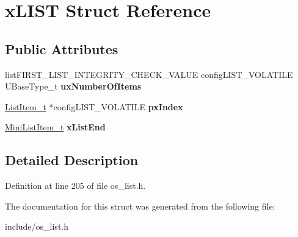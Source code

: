 \hypertarget{structxLIST}{}\section{x\+L\+I\+ST Struct Reference}
\label{structxLIST}
\subsection*{Public Attributes}
\begin{DoxyCompactItemize}
\item 
\mbox{\label{structxLIST_aa5cb7cdc699e1252af0441e46e427a03}} 
list\+F\+I\+R\+S\+T\+\_\+\+L\+I\+S\+T\+\_\+\+I\+N\+T\+E\+G\+R\+I\+T\+Y\+\_\+\+C\+H\+E\+C\+K\+\_\+\+V\+A\+L\+UE config\+L\+I\+S\+T\+\_\+\+V\+O\+L\+A\+T\+I\+LE U\+Base\+Type\+\_\+t {\bfseries ux\+Number\+Of\+Items}
\item 
\mbox{\label{structxLIST_a7bf64d87701493b4c8c5c977682500d7}} 
\mbox{\hyperlink{structxLIST__ITEM}{List\+Item\+\_\+t}} $\ast$config\+L\+I\+S\+T\+\_\+\+V\+O\+L\+A\+T\+I\+LE {\bfseries px\+Index}
\item 
\mbox{\label{structxLIST_a49ad62fa153126e27e273811167b336a}} 
\mbox{\hyperlink{structxMINI__LIST__ITEM}{Mini\+List\+Item\+\_\+t}} {\bfseries x\+List\+End}
\end{DoxyCompactItemize}


\subsection{Detailed Description}


Definition at line 205 of file os\+\_\+list.\+h.



The documentation for this struct was generated from the following file\+:\begin{DoxyCompactItemize}
\item 
include/os\+\_\+list.\+h\end{DoxyCompactItemize}
